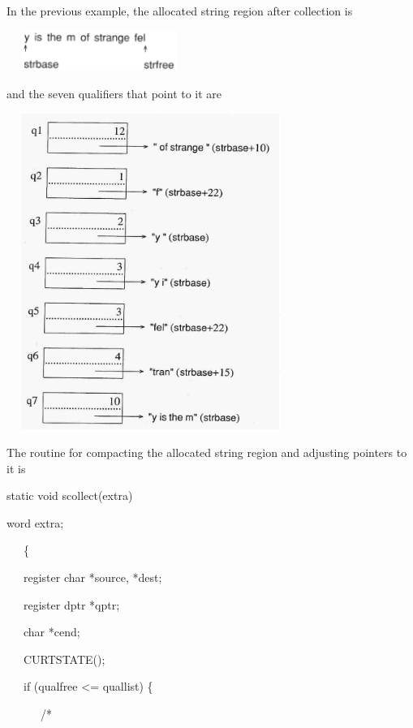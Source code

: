 In the previous example, the allocated string region after collection is

\begin{center}
\includegraphics[width=2.3807in,height=0.5193in]{ib-img/strangefel.png}
\end{center}

and the seven qualifiers that point to it are

\ \  \includegraphics[width=3.4193in,height=4.0602in]{ib-img/ib-img101.jpg} 


The routine for compacting the allocated string region and adjusting pointers to it is

{\ttfamily\mdseries
static void scollect(extra)
}

{\ttfamily\mdseries
word extra;
}

{\ttfamily\mdseries
\ \ \ \{
}

{\ttfamily\mdseries
\ \ \ register char *source, *dest;
}

{\ttfamily\mdseries
\ \ \ register dptr *qptr;
}

{\ttfamily\mdseries
\ \ \ char *cend;
}

{\ttfamily\mdseries
\ \ \ CURTSTATE();
}

\bigskip

{\ttfamily\mdseries
\ \ \ if (qualfree {\textless}= quallist) \{
}

{\ttfamily\mdseries
\ \ \ \ \ \ /*
}

